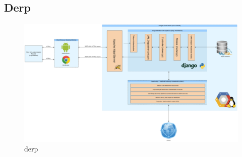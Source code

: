 \clearpage
\begin{landscape}

\section{Derp}

\begin{figure}
  \centering
  \begin{minipage}{180mm}
    \centering
    \includegraphics[width=180mm]{inc/architecture_diagram.jpg}
    \caption{derp}
    \label{fig:sentiment_analysis_step2b}
  \end{minipage}
\end{figure}

\end{landscape}
